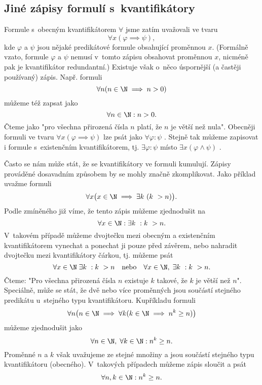 \subsection{Jiné zápisy formulí s~kvantifikátory}
Formule s~obecným kvantifikátorem $\forall$ jsme zatím uvažovali ve tvaru
\begin{equation*}
    \forall x(\varphi \implies \psi),
\end{equation*}
kde $\varphi$ a $\psi$ jsou nějaké predikátové formule obsahující proměnnou $x$. (Formálně vzato, formule $\varphi$ a $\psi$ nemusí v~tomto zápisu obsahovat proměnnou $x$, nicméně pak je kvantifikátor redundantní.) Existuje však o~něco úspornější (a častěji používaný) zápis. Např. formuli
\begin{equation*}
    \forall n (n \in \N \implies n > 0)
\end{equation*}
můžeme též zapsat jako
\begin{equation*}
    \forall n \in \N : n > 0.
\end{equation*}
Čteme jako "pro všechna přirozená čísla $n$ platí, že $n$ je větší než nula". Obecněji formuli ve tvaru $\forall x(\varphi \implies \psi)$ lze psát jako $\forall \varphi : \psi$ . Stejně tak můžeme zapisovat i formule s~existenčním kvantifikátorem, tj. $\exists \varphi : \psi$ místo $\exists x (\varphi \land \psi)$ .
\medskip

Často se nám může stát, že se kvantifikátory ve formuli kumulují. Zápisy prováděné dosavadním způsobem by se mohly značně zkomplikovat. Jako příklad uvažme formuli
\begin{equation*}
    \forall x \bigl(x \in \N \implies \exists k~(k~> n)\bigr).
\end{equation*}
Podle zmíněného již víme, že tento zápis můžeme zjednodušit na
\begin{equation*}
    \forall x \in \N : \exists k~: k~> n.
\end{equation*}
V~takovém případě můžeme dvojtečku mezi obecným a existenčním kvantifikátorem vynechat a ponechat ji pouze před závěrem, nebo nahradit dvojtečku mezi kvantifikátory čárkou, tj. můžeme psát
\begin{equation*}
    \forall x \in \N\;\exists k~: k~> n\quad\text{nebo}\quad\forall x \in \N ,\;\exists k~: k~> n.
\end{equation*}
Čteme: "Pro všechna přirozená čísla $n$ existuje $k$ takové, že $k$ je větší než $n$". Speciálně, může se stát, že dvě nebo více proměnných jsou součástí stejného predikátu u~stejného typu kvantifikátoru. Kupříkladu formuli
\begin{equation*}
    \forall n \bigl(n\in\N \implies \forall k(k\in\N \implies n^k \geq n)\bigr)
\end{equation*}
můžeme zjednodušit jako
\begin{equation*}
    \forall n\in\N ,\; \forall k\in\N : n^k\geq n.
\end{equation*}
Proměnné $n$ a $k$ však uvažujeme ze stejné množiny a jsou součástí stejného typu kvantifikátoru (obecného). V~takových případech můžeme zápis sloučit a psát
\begin{equation*}
    \forall n,k\in\N : n^k\geq n.
\end{equation*}


